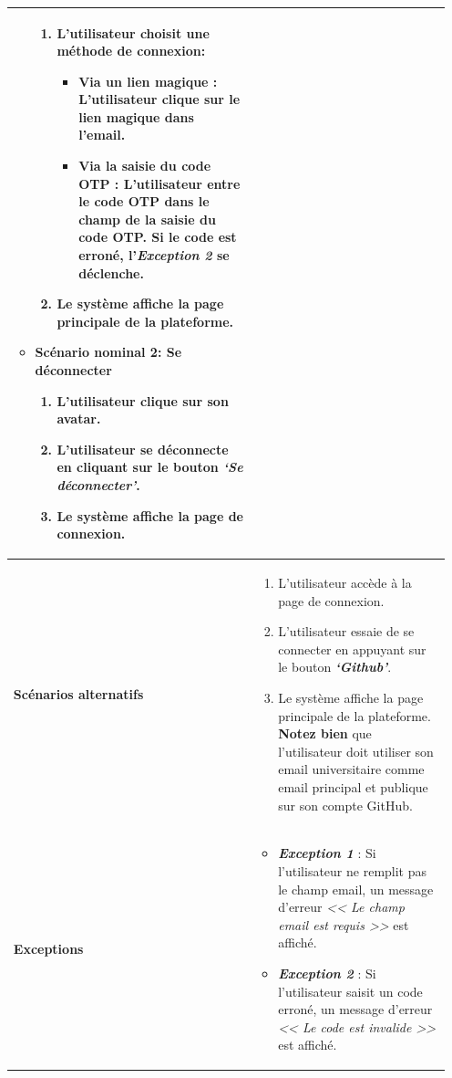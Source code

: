 \begin{itemize}[itemsep=1pt, parsep=1pt]
\begin{longtable}{|>{\RaggedRight\arraybackslash}p{4cm}|>{\RaggedRight\arraybackslash}p{12cm}|}
\begin{itemize}[label=]
\begin{enumerate}
                \item L’utilisateur choisit une méthode de connexion: 
                \begin{itemize}[label=--]
                    \item \textbf{Via un lien magique :} L’utilisateur clique sur le lien magique dans l’email.
                    \item \textbf{Via la saisie du code OTP :} L’utilisateur entre le code OTP dans le champ de la saisie du code OTP. Si le code est erroné, l'\textbf{\textit{Exception 2}} se déclenche.
                \end{itemize}
                \item Le système affiche la page principale de la plateforme.
            \end{enumerate}
            \item \textbf{Scénario nominal 2: Se déconnecter}
            \begin{enumerate}
                \item L’utilisateur clique sur son avatar.
                \item L’utilisateur se déconnecte en cliquant sur le bouton \textbf{\textit{‘Se déconnecter’}}.
                \item Le système affiche la page de connexion.
            \end{enumerate}
        \end{itemize} \\
        \hline
        \textbf{Scénarios alternatifs} & 
        \begin{enumerate}
            \item L’utilisateur accède à la page de connexion.
            \item L’utilisateur essaie de se connecter en appuyant sur le bouton \textbf{\textit{‘Github’}}. 
            \item Le système affiche la page principale de la plateforme. \newline \textbf{Notez bien} que l'utilisateur doit utiliser son email universitaire comme email principal et publique sur son compte GitHub.
        \end{enumerate} \\
        \hline
        \textbf{Exceptions} & 
        \begin{itemize}[label=--]
            \item \textbf{\textit{Exception 1}} : Si l’utilisateur ne remplit pas le champ email, un message d’erreur \textit{<< Le champ email est requis >>} est affiché.
            \item \textbf{\textit{Exception 2}} : Si l’utilisateur saisit un code erroné, un message d’erreur \textit{<< Le code est invalide >>} est affiché.
        \end{itemize} \\
        \hline
    \end{longtable}
    \label{tab:Description textuelle du cas d’utilisation « s’identifiere »}


\end{itemize}
